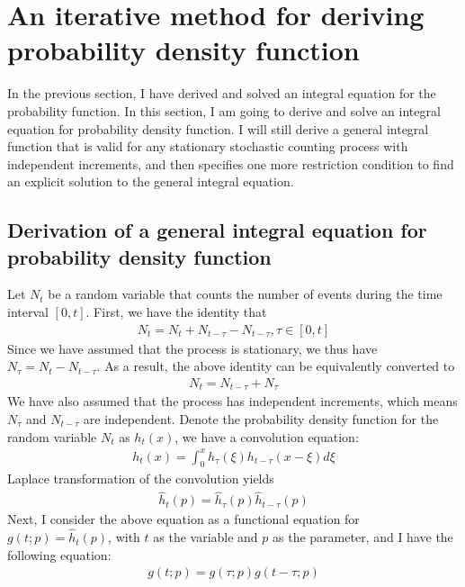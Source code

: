 \documentclass[10pt]{article}
\numberwithin{figure}{section}
\numberwithin{equation}{section}
\begin{document}
\section{An iterative method for deriving probability density function}
\label{probability_density_function}
In the previous section, I have derived and solved an integral equation for the probability function. In this section, I am going to derive and solve an integral equation for probability density function. I will still derive a general integral function that is valid for any stationary stochastic counting process with independent increments, and then specifies one more restriction condition to find an explicit solution to the general integral equation. 

\subsection{Derivation of a general integral equation for probability density function}
Let $N_t$ be a random variable that counts the number of events during the time interval $[0, t]$. First, we have the identity that 
\begin{align}
N_{t} = N_{t} + N_{t-\tau} - N_{t - \tau}, \tau \in [0, t]
\end{align}
Since we have assumed that the process is stationary, we thus have $N_{\tau} = N_{t} - N_{t - \tau}$. As a result, the above identity can be equivalently converted to 
\begin{eqnarray}
N_{t} = N_{t - \tau} + N_{\tau}
\end{eqnarray}
We have also assumed that the process has independent increments, which means $N_{\tau}$ and $N_{t - \tau}$ are independent. Denote the probability density function for the random variable $N_{t}$ as $h_{t}(x)$, we have a convolution equation: 
\begin{eqnarray}
h_{t}(x) = \int_{0}^{x} h_{\tau}(\xi) h_{t - \tau}(x - \xi) d\xi
\label{density_convolution}
\end{eqnarray}
Laplace transformation of the convolution yields 
\begin{eqnarray}
\hat{h}_{t}(p) = \hat{h}_{\tau}(p) \hat{h}_{t - \tau}(p)
\end{eqnarray}
Next, I consider the above equation as a functional equation for $g(t; p) = \hat{h}_{t}(p)$, with $t$ as the variable and $p$ as the parameter, and I have the following equation: 
\begin{eqnarray}
g(t; p) = g(\tau; p) g(t - \tau; p)
\label{functional}
\end{eqnarray}
\end{document}
